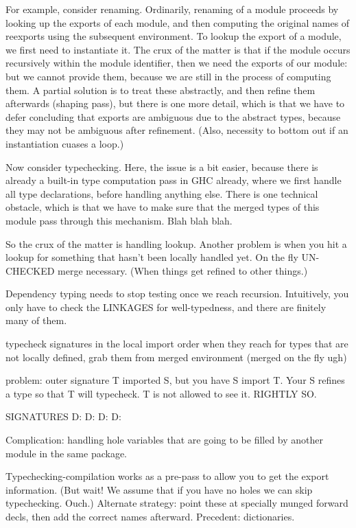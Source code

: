 For example, consider renaming.  Ordinarily, renaming of a module
proceeds by looking up the exports of each module, and then computing
the original names of reexports using the subsequent environment.
To lookup the export of a module, we first need to instantiate it.
The crux of the matter is that if the module occurs recursively
within the module identifier, then we need the exports of our module:
but we cannot provide them, because we are still in the process
of computing them.  A partial solution is to treat these abstractly,
and then refine them afterwards (shaping pass), but there is one
more detail, which is that we have to defer concluding that exports
are ambiguous due to the abstract types, because they may not be
ambiguous after refinement.  (Also, necessity to bottom out if an
instantiation cuases a loop.)

Now consider typechecking.  Here, the issue is a bit easier, because
there is already a built-in type computation pass in GHC already,
where we first handle all type declarations, before handling anything
else.  There is one technical obstacle, which is that we have to make
sure that the merged types of this module pass through this mechanism.
Blah blah blah.

So the crux of the matter is handling lookup.  Another problem is
when you hit a lookup for something that hasn't been locally handled
yet.  On the fly UN-CHECKED merge necessary.  (When things get refined to other
things.)

Dependency typing needs to stop testing once we reach
recursion. Intuitively, you only have to check the
LINKAGES for well-typedness, and there are finitely
many of them.



typecheck signatures in the local import order
    when they reach for types that are not locally defined, grab them
    from merged environment (merged on the fly ugh)

    problem: outer signature T imported S, but you have S import T.
    Your S refines a type so that T will typecheck. T is not allowed
    to see it. RIGHTLY SO.

SIGNATURES D: D: D: D:

Complication: handling hole variables that are going to be filled
by another module in the same package.

Typechecking-compilation works as a pre-pass to allow you to
get the export information.  (But wait! We assume that if you have
no holes we can skip typechecking. Ouch.)  Alternate strategy:
point these at specially munged forward decls, then add the
correct names afterward.  Precedent: dictionaries.

